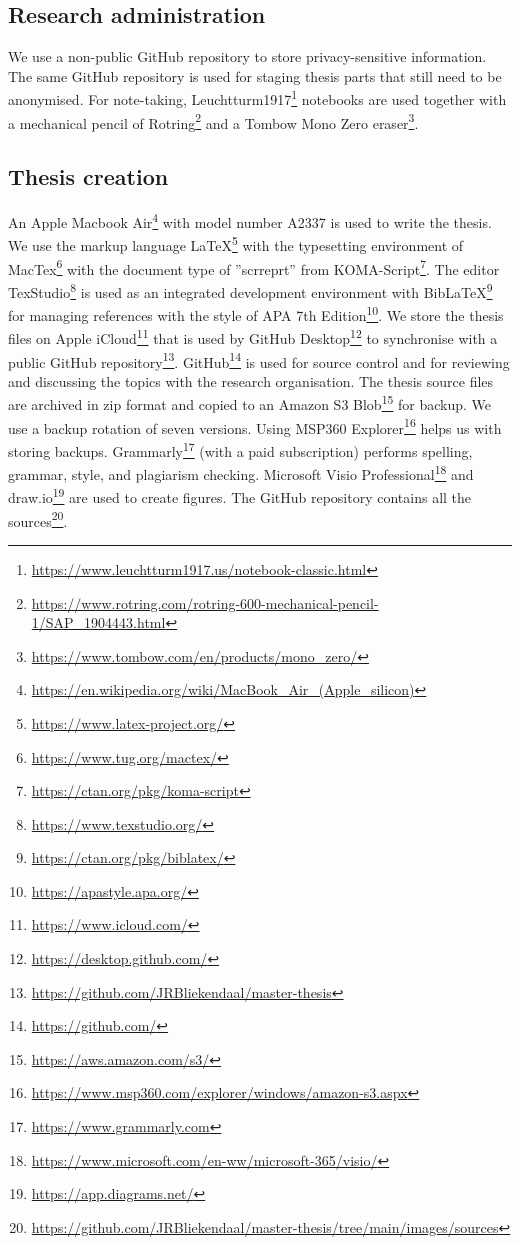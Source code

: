 \subsection{Research administration}
\label{sub:tbresearchadministration}
We use a non-public GitHub repository to store privacy-sensitive information. The same GitHub repository is used for staging thesis parts that still need to be anonymised. For note-taking, Leuchtturm1917\footnote{\url{https://www.leuchtturm1917.us/notebook-classic.html}} notebooks are used together with a mechanical pencil of Rotring\footnote{\url{https://www.rotring.com/rotring-600-mechanical-pencil-1/SAP_1904443.html}} and a Tombow Mono Zero eraser\footnote{\url{https://www.tombow.com/en/products/mono_zero/}}.
\subsection{Thesis creation}
\label{subsub:tbresearchcreation}
An Apple Macbook Air\footnote{\url{https://en.wikipedia.org/wiki/MacBook_Air_(Apple_silicon)}} with model number A2337 is used to write the thesis. We use the markup language \LaTeX\footnote{\url{https://www.latex-project.org/}} with the typesetting environment of MacTex\footnote{\url{https://www.tug.org/mactex/}} with the document type of ''scrreprt'' from KOMA-Script\footnote{\url{https://ctan.org/pkg/koma-script}}. The editor TexStudio\footnote{\url{https://www.texstudio.org/}} is used as an integrated development environment with Bib\LaTeX\footnote{\url{https://ctan.org/pkg/biblatex/}} for managing references with the style of APA 7th Edition\footnote{\url{https://apastyle.apa.org/}}. We store the thesis files on Apple iCloud\footnote{\url{https://www.icloud.com/}} that is used by GitHub Desktop\footnote{\url{https://desktop.github.com/}} to synchronise with a public GitHub repository\footnote{\url{https://github.com/JRBliekendaal/master-thesis}}. GitHub\footnote{\url{https://github.com/}}  is used for source control and for reviewing and discussing the topics with the research organisation. The thesis source files are archived in zip format and copied to an Amazon S3 Blob\footnote{\url{https://aws.amazon.com/s3/}} for backup. We use a backup rotation of seven versions. Using MSP360 Explorer\footnote{\url{https://www.msp360.com/explorer/windows/amazon-s3.aspx}} helps us with storing backups. Grammarly\footnote{\url{https://www.grammarly.com}} (with a paid subscription) performs spelling, grammar, style, and plagiarism checking. Microsoft Visio Professional\footnote{\url{https://www.microsoft.com/en-ww/microsoft-365/visio/}} and draw.io\footnote{\url{https://app.diagrams.net/}} are used to create figures. The GitHub repository contains all the sources\footnote{\url{https://github.com/JRBliekendaal/master-thesis/tree/main/images/sources}}.